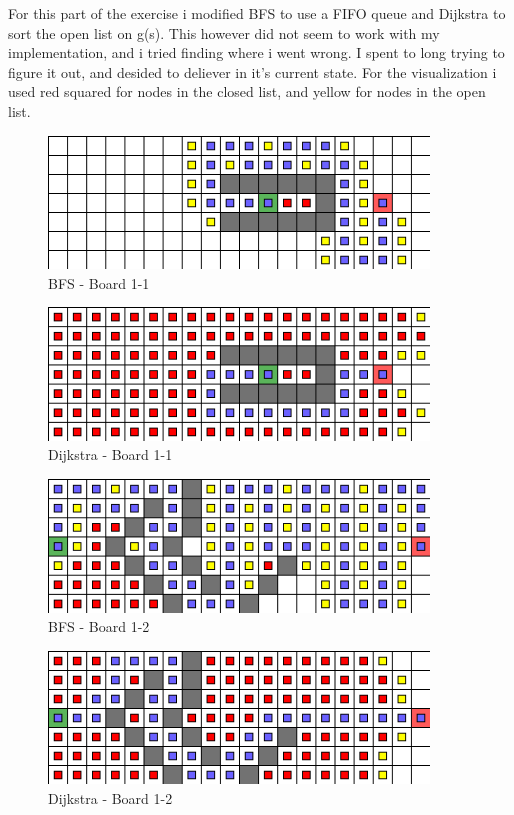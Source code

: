 \documentclass{article}
\begin{document}
	For this part of the exercise i modified BFS to use a FIFO queue and Dijkstra to sort the open list on g(s). This however did not seem to work with my implementation, and i tried finding where i went wrong. I spent to long trying to figure it out, and desided to deliever in it's current state. For the visualization i used red squared for nodes in the closed list, and yellow for nodes in the open list. 

	\begin{figure}[!htb]
		\caption{BFS - Board 1-1}
		\includegraphics[width=0.9\textwidth]{Bfs1-1.png}
	\end{figure}
	\begin{figure}[!htb]
		\caption{Dijkstra - Board 1-1}
		\includegraphics[width=0.9\textwidth]{Dijkstra-1-1.png}
	\end{figure}


	\begin{figure}[!htb]
		\caption{BFS - Board 1-2}
		\includegraphics[width=0.9\textwidth]{Bfs1-2.png}
	\end{figure}
	\begin{figure}[!htb]
		\caption{Dijkstra - Board 1-2}
		\includegraphics[width=0.9\textwidth]{Dijkstra-1-2.png}
	\end{figure}
\end{document}
